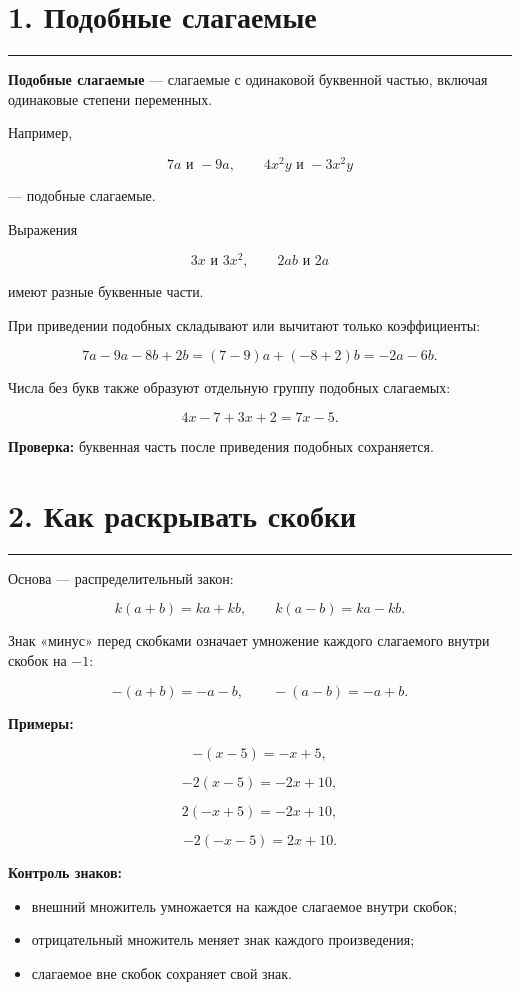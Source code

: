 \documentclass[a4paper,12pt]{article}
\newcommand{\topicline}{%
  \par
  \noindent
  \color{accent}%
  \rule{\linewidth}{0.6pt}%
  \color{black}%
  \par
}
\newcommand{\term}[1]{%
  \textbf{\color{darkaccent}#1}%
}
\begin{document}

\section*{1. Подобные слагаемые}
\topicline

\term{Подобные слагаемые} --- слагаемые с одинаковой
буквенной частью, включая одинаковые степени переменных.

Например,

\[
7a \text{ и } -9a,
\qquad
4x^2y \text{ и } -3x^2y
\]

--- подобные слагаемые.

Выражения

\[
3x \text{ и } 3x^2,
\qquad
2ab \text{ и } 2a
\]

имеют разные буквенные части.

При приведении подобных складывают или вычитают
только коэффициенты:

\[
7a-9a-8b+2b
=
(7-9)a+(-8+2)b
=
-2a-6b.
\]

Числа без букв также образуют отдельную группу
подобных слагаемых:

\[
4x-7+3x+2
=
7x-5.
\]

\textbf{Проверка:}
буквенная часть после приведения подобных сохраняется.


\section*{2. Как раскрывать скобки}
\topicline

Основа --- распределительный закон:

\[
k(a+b)=ka+kb,
\qquad
k(a-b)=ka-kb.
\]

Знак «минус» перед скобками означает умножение
каждого слагаемого внутри скобок на $-1$:

\[
-(a+b)=-a-b,
\qquad
-(a-b)=-a+b.
\]

\textbf{Примеры:}

\[
-(x-5)=-x+5,
\]

\[
-2(x-5)=-2x+10,
\]

\[
2(-x+5)=-2x+10,
\]

\[
-2(-x-5)=2x+10.
\]

\textbf{Контроль знаков:}

\begin{itemize}
  \item внешний множитель умножается на каждое
  слагаемое внутри скобок;

  \item отрицательный множитель меняет знак
  каждого произведения;

  \item слагаемое вне скобок сохраняет свой знак.
\end{itemize}
\end{document}

